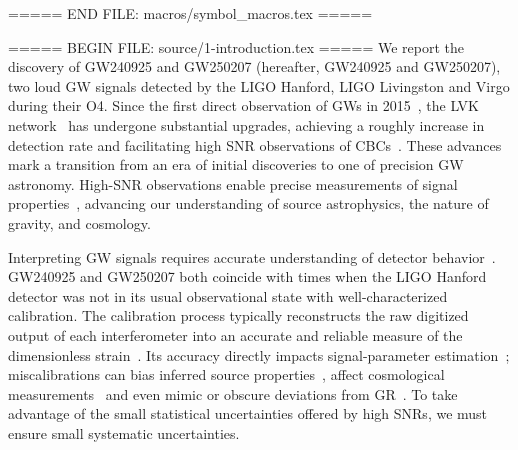 \newcommand{\VT}{\ensuremath{\langle VT \rangle}\xspace}
\newcommand{\pastro}{\ensuremath{p_{\mathrm{astro}}}\xspace}
\newcommand{\pterr}{\ensuremath{p_{\mathrm{terr}}}\xspace}
\newcommand{\pbbh}{\ensuremath{p_{\mathrm{BBH}}}\xspace}
\newcommand{\pbns}{\ensuremath{p_{\mathrm{BNS}}}\xspace}
\newcommand{\pnsbh}{\ensuremath{p_{\mathrm{NSBH}}}\xspace}
\newcommand{\comovingv}{\ensuremath{V_\mathrm{c}}}
\newcommand{\comovingvt}{\ensuremath{\langle VT_\mathrm{c} \rangle}}
\newcommand{\injspinmax}{\ensuremath{\chi_\mathrm{max}}}
\newcommand{\SNRsymbol}{\ensuremath{\rho}}
\newcommand{\SNRp}{\ensuremath{\SNRsymbol_\mathrm{p}}}
\newcommand{\SNRfour}{\ensuremath{\SNRsymbol_{44}}}
\newcommand{\SNRninty}{\ensuremath{\SNRsymbol_{90}}}
\newcommand{\SNRnoise}{\ensuremath{\SNRsymbol_{90}^{n}}}
\newcommand{\SNRH}{\ensuremath{\SNRsymbol_\mathrm{H}}}
\newcommand{\SNRL}{\ensuremath{\SNRsymbol_\mathrm{L}}}
\newcommand{\SNRV}{\ensuremath{\SNRsymbol_\mathrm{V}}}
\newcommand{\SNRGR}{\ensuremath{\SNRsymbol_\mathrm{GR}}}
\newcommand{\FFninty}{\ensuremath{\mathrm{FF}_{90}}}
===== END FILE: macros/symbol_macros.tex =====

===== BEGIN FILE: source/1-introduction.tex =====
We report the discovery of \acl{GW240925} and \acl{GW250207} (hereafter, \ac{GW240925} and \ac{GW250207}), two loud \ac{GW} signals detected by the \ac{LIGO} Hanford, \ac{LIGO} Livingston and Virgo during their \ac{O4}.
Since the first direct observation of \acp{GW} in 2015~\cite{LIGOScientific:2016aoc}, the \ac{LVK} network~\cite{LIGOScientific:2014pky, VIRGO:2014yos, KAGRA:2020tym} has undergone substantial upgrades, achieving a roughly \DETECTIONINCREASE{} increase in detection rate and facilitating high \ac{SNR} observations of \acp{CBC}~\cite{LIGOScientific:2025hdt,LIGOScientific:2025slb,KAGRA:2025oiz,LIGOO4Detector:2023wmz,membersoftheLIGOScientific:2024elc,Capote:2024rmo}.
These advances mark a transition from an era of initial discoveries to one of precision \ac{GW} astronomy.
High-\ac{SNR} observations enable precise measurements of signal properties~\cite{Cutler:1994ys,Purrer:2019jcp,LIGOScientific:2019hgc}, advancing our understanding of source astrophysics, the nature of gravity, and cosmology.

Interpreting \ac{GW} signals requires accurate understanding of detector behavior~\cite{LIGOScientific:2019hgc}.
\ac{GW240925} and \ac{GW250207} both coincide with times when the \ac{LIGO} Hanford detector was not in its usual observational state with well-characterized calibration.
The calibration process typically reconstructs the raw digitized output of each interferometer into an accurate and reliable measure of the dimensionless strain~\cite{LIGOScientific:2016xax,LIGOScientific:2017aaj,Sun:2020wke,VIRGO:2021umk}.
Its accuracy directly impacts signal-parameter estimation~\cite{Hall:2017off,Essick:2022vzl}; miscalibrations can bias inferred source properties~\cite{Vitale:2011wu,Kumar:2025nwb}, affect cosmological measurements~\cite{Huang:2022rdg} and even mimic or obscure deviations from \ac{GR}~\cite{Gupta:2024gun,Sinha:2025snr}.
To take advantage of the small statistical uncertainties offered by high \acp{SNR}, we must ensure small systematic uncertainties.

